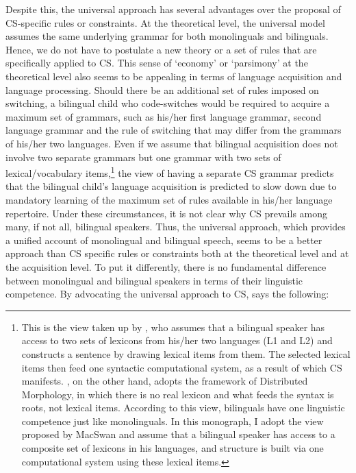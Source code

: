 \largerpage[-1]
Despite this, the universal approach has several advantages over the proposal of \ac{CS}-specific rules or constraints. At the theoretical level, the universal model assumes the same underlying grammar for both monolinguals and bilinguals. Hence, we do not have to postulate a new theory or a set of rules that are specifically applied to \ac{CS}. This sense of `economy' or `parsimony' at the theoretical level also seems to be appealing in terms of language acquisition and language processing. Should there be an additional set of rules imposed on switching, a bilingual child who code-switches would be required to acquire a maximum set of grammars, such as his/her first language grammar, second language grammar and the rule of switching that may differ from the grammars of his/her two languages. Even if we assume that bilingual acquisition does not involve two separate grammars but one grammar with two sets of lexical/vocabulary items,\footnote{This is the view taken up by \citet{MacSwan1999}, who assumes that a bilingual speaker has access to two sets of lexicons from his/her two languages (L1 and L2) and constructs a sentence by drawing lexical items from them. The selected lexical items then feed one syntactic computational system, as a result of which \ac{CS} manifests. \citet{Lopez2020}, on the other hand, adopts the framework of Distributed Morphology, in which there is no real lexicon and what feeds the syntax is roots, not lexical items. According to this view, bilinguals have one linguistic competence just like monolinguals. In this monograph, I adopt the view proposed by MacSwan and assume that a bilingual speaker has access to a composite set of lexicons in his languages, and structure is built via one computational system using these lexical items.} 
the view of having a separate \ac{CS} grammar predicts that the bilingual child’s language acquisition is predicted to slow down due to mandatory learning of the maximum set of rules available in his/her language repertoire. Under these circumstances, it is not clear why \ac{CS} prevails among many, if not all, bilingual speakers. Thus, the universal approach, which provides a unified account of monolingual and bilingual speech, seems to be a better approach than \ac{CS} specific rules or constraints both at the theoretical level and at the acquisition level. To put it differently, there is no fundamental difference between monolingual and bilingual speakers in terms of their linguistic competence. By advocating the universal approach to \ac{CS}, \citet[6]{Lopez2020} says the following: 

